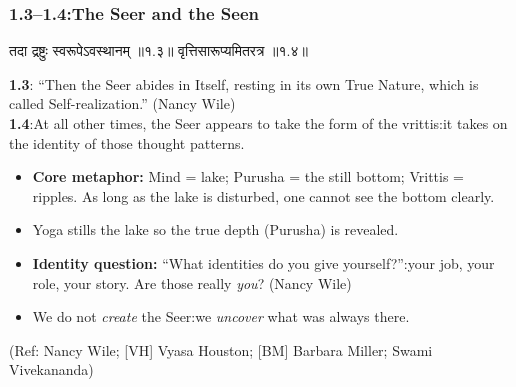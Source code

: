 \begin{frame}[fragile]\frametitle{1.3–1.4:The Seer and the Seen}

\begin{sanskrit}
तदा द्रष्टुः स्वरूपेऽवस्थानम् ॥१.३॥
वृत्तिसारूप्यमितरत्र ॥१.४॥
\end{sanskrit}

\textbf{1.3}: ``Then the Seer abides in Itself, resting in its own True Nature, which is called Self-realization.'' (Nancy Wile)\\
\textbf{1.4}:At all other times, the Seer appears to take the form of the vrittis:it takes on the identity of those thought patterns.

\begin{itemize}
\item \textbf{Core metaphor:} Mind = lake; Purusha = the still bottom; Vrittis = ripples. As long as the lake is disturbed, one cannot see the bottom clearly.
\item Yoga stills the lake so the true depth (Purusha) is revealed.
\item \textbf{Identity question:} ``What identities do you give yourself?'':your job, your role, your story. Are those really \emph{you}? (Nancy Wile)
\item We do not \emph{create} the Seer:we \emph{uncover} what was always there.
\end{itemize}

\tiny{(Ref: Nancy Wile; [VH] Vyasa Houston; [BM] Barbara Miller; Swami Vivekananda)}

\end{frame}

